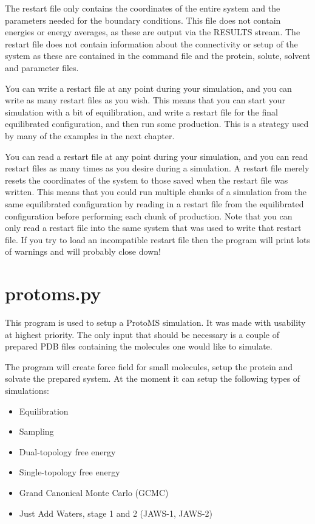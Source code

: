 \documentclass[letterpaper,10pt,english]{sphinxmanual}
\begin{document}
The restart file only contains the coordinates of the entire system and the parameters needed for the boundary conditions. This file does not contain energies or energy averages, as these are output via the RESULTS stream. The restart file does not contain information about the connectivity or setup of the system as these are contained in the command file and the protein, solute, solvent and parameter files.

You can write a restart file at any point during your simulation, and you can write as many restart files as you wish. This means that you can start your simulation with a bit of equilibration, and write a restart file for the final equilibrated configuration, and then run some production. This is a strategy used by many of the examples in the next chapter.

You can read a restart file at any point during your simulation, and you can read restart files as many times as you desire during a simulation. A restart file merely resets the coordinates of the system to those saved when the restart file was written. This means that you could run multiple chunks of a simulation from the same equilibrated configuration by reading in a restart file from the equilibrated configuration before performing each chunk of production. Note that you can only read a restart file into the same system that was used to write that restart file. If you try to load an incompatible restart file then the program will print lots of warnings and will probably close down!


\chapter{protoms.py}
\label{\detokenize{protomspy:protoms-py}}\label{\detokenize{protomspy::doc}}
This program is used to setup a ProtoMS simulation. It was made with usability at highest priority. The only input that should be necessary is a couple of prepared PDB files containing the molecules one would like to simulate.

The program will create force field for small molecules, setup the protein and solvate the prepared system. At the moment it can setup the following types of simulations:
\begin{itemize}
\item {} 
Equilibration

\item {} 
Sampling

\item {} 
Dual-topology free energy

\item {} 
Single-topology free energy

\item {} 
Grand Canonical Monte Carlo (GCMC)

\item {} 
Just Add Waters, stage 1 and 2 (JAWS-1, JAWS-2)

\end{itemize}
\end{document}

